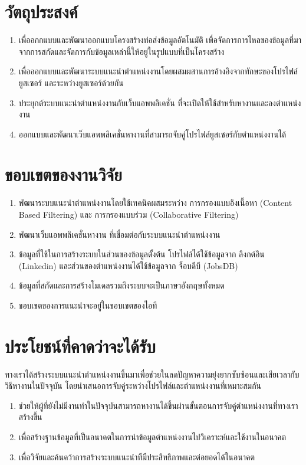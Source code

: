 \section{วัตถุประสงค์}
\begin{enumerate}
  \item เพื่ออกกแบบและพัฒนาออกแบบโครงสร้างท่อส่งข้อมูลอัตโนมัติ เพื่อจัดการการไหลของข้อมูลที่มาจากการสกัดและจัดการกับข้อมูลเหล่านี้ให้อยู่ในรูปแบบที่เป็นโครงสร้าง
  \item เพื่อออกแบบและพัฒนาระบบแนะนำตำแหน่งงานโดยผสมผสานการอ้างอิงจากทักษะของโปรไฟล์ยูสเซอร์ และระหว่างยูสเซอร์ด้วยกัน
  \item ประยุกต์ระบบแนะนำตำแหน่งงานกับเว็บแอพพลิเคชั่น ที่จะเปิดให้ใช้สำหรับหางานและลงตำแหน่งงาน
  \item ออกแบบและพัฒนาเว็บแอพพลิเคชั่นหางานที่สามารถจับคู่โปรไฟล์ยูสเซอร์กับตำแหน่งงานได้
\end{enumerate}

\section{ขอบเขตของงานวิจัย}
\begin{enumerate}
    \item พัฒนาระบบแนะนำตำแหน่งงานโดยใช้เทคนิคผสมระหว่าง การกรองแบบอิงเนื้อหา (Content Based Filtering) และ การกรองแบบร่วม (Collaborative Filtering)
    \item พัฒนาเว็บแอพพลิเคชั่นหางาน ที่เชื่อมต่อกับระบบแนะนำตำแหน่งงาน
    \item ข้อมูลที่ใช้ในการสร้างระบบในส่วนของข้อมูลตั้งต้น โปรไฟล์ได้ใช้ข้อมูลจาก ลิงกต์อิน (Linkedin) และส่วนของตำแหน่งงานได้ใช้ข้อมูลจาก จ็อบดีบี (JobsDB)
    \item ข้อมูลที่สกัดและการสร้างโมเดลรวมถึงระบบจะเป็นภาษาอังกฤษทั้งหมด
    \item ขอบเขตของการแนะนำจะอยู่ในขอบเขตของไอที
\end{enumerate}

\section{ประโยชน์ที่คาดว่าจะได้รับ}
ทางเราได้สร้างระบบแนะนำตำแหน่งงานขึ้นมาเพื่อช่วยในลดปัญหาความยุ่งยากซับซ้อนและเสียเวลากับวิธีหางานในปัจจุบัน โดยนำเสนอการจับคู่ระหว่างโปรไฟล์และตำแหน่งงานที่เหมาะสมกัน
\begin{enumerate}
  \item ช่วยให้ผู้ที่ยังไม่มีงานทำในปัจจุบันสามารถหางานได้ขึ้นผ่านขั้นตอนการจับคู่ตำแหน่งงานที่ทางเราสร้างขึ้น
  \item เพื่อสร้างฐานข้อมูลที่เป็นอนาคตในการนำข้อมูลตำแหน่งงานไปวิเคราะห์และใช้งานในอนาคต
  \item เพื่อวิจัยและค้นคว้าการสร้างระบบแนะนำทีมีประสิทธิภาพและต่อยอดได้ในอนาคต
\end{enumerate}


